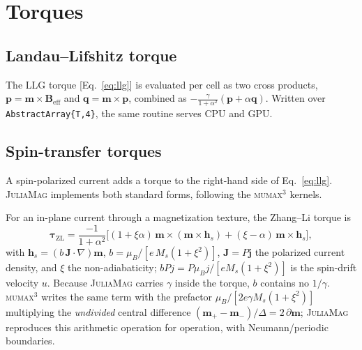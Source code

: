\documentclass{article}      %
\newcommand{\JuliaMag}{\textsc{JuliaMag}}
\newcommand{\mumax}{\textsc{mumax}$^3$}
\newcommand{\vm}{\bm{m}}
\newcommand{\vB}{\bm{B}}
\begin{document}
\section{Torques}
\label{sec:torques}

\subsection{Landau--Lifshitz torque}

The LLG torque [Eq.~\eqref{eq:llg}] is evaluated per cell as two cross products,
$\bm{p}=\vm\times\vB_{\mathrm{eff}}$ and $\bm{q}=\vm\times\bm{p}$, combined as
$-\frac{\gamma}{1+\alpha^2}(\bm{p}+\alpha\bm{q})$. Written over
\texttt{AbstractArray\{T,4\}}, the same routine serves CPU and GPU.

\subsection{Spin-transfer torques}
\label{sec:stt}

A spin-polarized current adds a torque to the right-hand side of
Eq.~\eqref{eq:llg}. \JuliaMag{} implements both standard forms, following the
\mumax{} kernels.

For an in-plane current through a magnetization texture, the Zhang--Li torque is
%
\begin{equation}
  \bm{\tau}_{\mathrm{ZL}}
  = \frac{-1}{1+\alpha^2}
    \Big[(1+\xi\alpha)\,\vm\times(\vm\times\bm{h}_s)
        + (\xi-\alpha)\,\vm\times\bm{h}_s\Big],
  \label{eq:zhangli}
\end{equation}
%
with $\bm{h}_s = (b\,\bm{J}\cdot\nabla)\vm$, $b = \mu_B/[e\,M_s(1+\xi^2)]$,
$\bm{J}=P\bm{j}$ the polarized current density, and $\xi$ the
non-adiabaticity; $bPj = P\mu_B j/[e M_s(1+\xi^2)]$ is the spin-drift
velocity $u$. Because \JuliaMag{} carries $\gamma$ inside the torque, $b$
contains no $1/\gamma$. \mumax{} writes the same term with the prefactor
$\mu_B/[2e\gamma M_s(1+\xi^2)]$ multiplying the \emph{undivided} central
difference $(\vm_{+}-\vm_{-})/\Delta = 2\,\partial\vm$; \JuliaMag{} reproduces this
arithmetic operation for operation, with Neumann/periodic boundaries.
\end{document}
